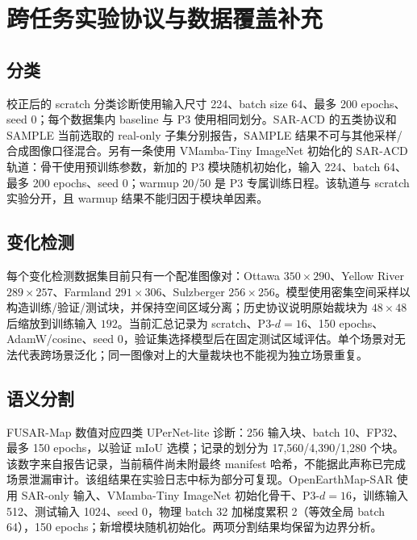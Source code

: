 \documentclass[UTF8,12pt,a4paper]{ctexart}
\begin{document}
\section{跨任务实验协议与数据覆盖补充}
\subsection{分类}
校正后的 scratch 分类诊断使用输入尺寸 224、batch size 64、最多 200 epochs、seed 0；每个数据集内 baseline 与 P3 使用相同划分。SAR-ACD 的五类协议和 SAMPLE 当前选取的 real-only 子集分别报告，SAMPLE 结果不可与其他采样/合成图像口径混合。另有一条使用 VMamba-Tiny ImageNet 初始化的 SAR-ACD 轨道：骨干使用预训练参数，新加的 P3 模块随机初始化，输入 224、batch 64、最多 200 epochs、seed 0；warmup 20/50 是 P3 专属训练日程。该轨道与 scratch 实验分开，且 warmup 结果不能归因于模块单因素。

\subsection{变化检测}
每个变化检测数据集目前只有一个配准图像对：Ottawa $350\times290$、Yellow River $289\times257$、Farmland $291\times306$、Sulzberger $256\times256$。模型使用密集空间采样以构造训练/验证/测试块，并保持空间区域分离；历史协议说明原始裁块为 $48\times48$ 后缩放到训练输入 $192$。当前汇总记录为 scratch、P3-$d=16$、150 epochs、AdamW/cosine、seed 0，验证集选择模型后在固定测试区域评估。单个场景对无法代表跨场景泛化；同一图像对上的大量裁块也不能视为独立场景重复。

\subsection{语义分割}
FUSAR-Map 数值对应四类 UPerNet-lite 诊断：256 输入块、batch 10、FP32、最多 150 epochs，以验证 mIoU 选模；记录的划分为 17,560/4,390/1,280 个块。该数字来自报告记录，当前稿件尚未附最终 manifest 哈希，不能据此声称已完成场景泄漏审计。该组结果在实验日志中标为部分可复现。OpenEarthMap-SAR 使用 SAR-only 输入、VMamba-Tiny ImageNet 初始化骨干、P3-$d=16$，训练输入 512、测试输入 1024、seed 0，物理 batch 32 加梯度累积 2（等效全局 batch 64），150 epochs；新增模块随机初始化。两项分割结果均保留为边界分析。
\end{document}
